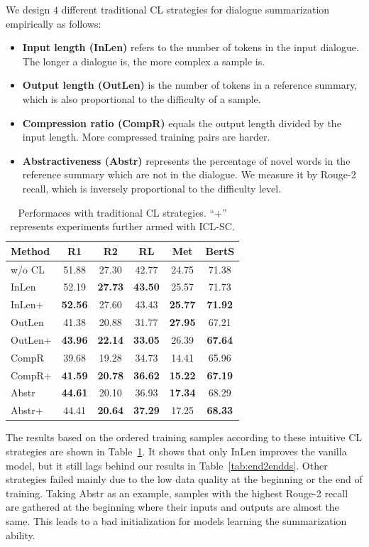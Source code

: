 We design $4$ different traditional CL strategies %
for dialogue summarization empirically as follows:
\begin{itemize}
	\item \textbf{Input length (InLen)} refers to the number of tokens in the input dialogue. The longer a dialogue is, the more complex a sample is.
	\item \textbf{Output length (OutLen)} is the number of tokens in a reference summary, which is also proportional to the difficulty of a sample.
	\item \textbf{Compression ratio (CompR)} equals the output length divided by the input length. More compressed training pairs are harder.%
	\item \textbf{Abstractiveness (Abstr)} represents the percentage of novel words in the reference summary which are not in the dialogue. We measure it by Rouge-2 recall, which is inversely proportional to the difficulty level.
\end{itemize}

\begin{table}[t]
	\scriptsize
	\centering
	\begin{tabular}{lccccc}
		\hline
		{Method} & {R1} & {R2} & {RL} & {Met} & {BertS} \\
		\hline
		w/o CL & 51.88 & 27.30 & 42.77 & 24.75 & 71.38 \\
		\hline
		InLen & 52.19 & \textbf{27.73} & \textbf{43.50} & 25.57 & 71.73\\
		InLen+ & \textbf{52.56} & 27.60 & 43.43 & \textbf{25.77} & \textbf{71.92}\\
		\hline
		OutLen & 41.38 & 20.88 & 31.77 & \textbf{27.95} & 67.21\\
		OutLen+ &\textbf{43.96} & \textbf{22.14} & \textbf{33.05} & 26.39 & \textbf{67.64} \\
		\hline
		CompR & 39.68 & 19.28 & 34.73 & 14.41 & 65.96 \\
		CompR+ & \textbf{41.59} & \textbf{20.78} & \textbf{36.62} & \textbf{15.22} & \textbf{67.19}\\
		\hline
		Abstr & \textbf{44.61} & 20.10 & 36.93 & \textbf{17.34} & 68.29 \\
		Abstr+ & 44.41 & \textbf{20.64} & \textbf{37.29} & 17.25 & \textbf{68.33} \\
		\hline
	\end{tabular}
	\caption{Performaces with traditional CL strategies. ``+'' represents experiments further armed with ICL-SC.}
	\label{tab:traditional}
\end{table}
The results based on the ordered training samples according to these intuitive CL strategies are shown in Table~\ref{tab:traditional}. It shows that only InLen improves the vanilla model, but it still lags behind our results in Table~\ref{tab:end2endds}. Other strategies failed mainly due to the low data quality at the beginning or the end of training. 
Taking Abstr as an example, samples with the highest 
Rouge-2 recall are gathered at the beginning where 
their inputs and outputs are almost the same. 
This leads to a bad initialization for models learning 
the summarization ability. 

